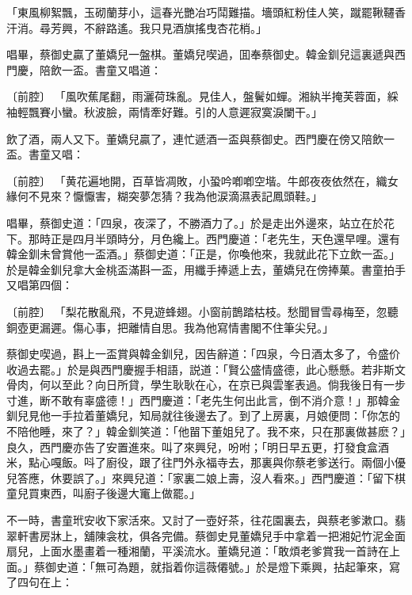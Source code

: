 \begin{myquote}
「東風柳絮飄，玉砌蘭芽小，這春光艷冶巧鬦難描。墻頭紅粉佳人笑，蹴罷鞦韆香汗消。尋芳興，不辭路遙。我只見酒旗搖曳杏花梢。」
\end{myquote}

唱畢，蔡御史贏了董嬌兒一盤棋。董嬌兒喫過，囬奉蔡御史。韓金釧兒這裏遞與西門慶，陪飲一盃。書童又唱道：

\begin{myquote}
{\markfont〔前腔〕}
「風吹蕉尾翻，雨灑荷珠亂。見佳人，盤鬢如蟬。湘紈半掩芙蓉面，綵袖輕飄賽小蠻。秋波臉，兩情牽好難。引的人意遲寂寞淚闌干。」
\end{myquote}

飲了酒，兩人又下。董嬌兒贏了，連忙遞酒一盃與蔡御史。西門慶在傍又陪飲一盃。書童又唱：

\begin{myquote}
{\markfont〔前腔〕}
「黄花遍地開，百草皆凋敗，小蛩吟喞喞空堦。牛郎夜夜依然在，織女緣何不見來？懨懨害，糊突夢怎猜？我為他涙滴濕表記鳳頭鞋。」
\end{myquote}

唱畢，蔡御史道：「四泉，夜深了，不勝酒力了。」於是走出外邊來，站立在於花下。那時正是四月半頭時分，月色纔上。西門慶道：「老先生，天色還早哩。還有韓金釧未曾賞他一盃酒。」蔡御史道：「正是，你喚他來，我就此花下立飲一盃。」於是韓金釧兒拿大金桃盃滿斟一盃，用纖手捧遞上去，董嬌兒在傍捧菓。書童拍手又唱第四個：

\begin{myquote}
{\markfont〔前腔〕}
「梨花散亂飛，不見遊蜂翅。小窗前鵲踏枯枝。愁聞冒雪尋梅至，忽聽銅壺更漏遲。傷心事，把離情自思。我為他寫情書閣不住筆尖兒。」
\end{myquote}

蔡御史喫過，斟上一盃賞與韓金釧兒，因告辭道：「四泉，今日酒太多了，令盛价收過去罷。」於是與西門慶握手相語，説道：「賢公盛情盛德，此心懸懸。若非斯文骨肉，何以至此？向日所貸，學生耿耿在心，在京已與雲峯表過。倘我後日有一步寸進，断不敢有辜盛德！」西門慶道：「老先生何出此言，倒不消介意！」那韓金釧兒見他一手拉着董嬌兒，知局就往後邊去了。到了上房裏，月娘便問：「你怎的不陪他睡，來了？」韓金釧笑道：「他㽞下董姐兒了。我不來，只在那裏做甚麽？」良久，西門慶亦告了安置進來。叫了來興兒，吩咐；「明日早五更，打發食盒酒米，點心嘎飯。呌了廚役，跟了往門外永福寺去，那裏與你蔡老爹送行。兩個小優兒答應，休要誤了。」來興兒道：「家裏二娘上壽，沒人看來。」西門慶道：「留下棋童兒買東西，叫廚子後邊大竃上做罷。」

不一時，書童玳安收下家活來。又討了一壺好茶，往花園裏去，與蔡老爹漱口。翡翠軒書房牀上，舖陳衾枕，俱各完備。蔡御史見董嬌兒手中拿着一把湘妃竹泥金面扇兒，上面水墨畫着一種湘蘭，平溪流水。董嬌兒道：「敢煩老爹賞我一首詩在上面。」蔡御史道：「無可為題，就指着你這薇僊號。」於是燈下乘興，拈起筆來，寫了四句在上：

